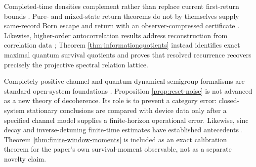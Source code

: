 Completed-time densities complement rather than replace current first-return
bounds \cite{KotowskiOszmaniec2026,GuptaShort2026}.  Pure- and mixed-state
return theorems do not by themselves supply same-record Born escape and
return with an observer-compressed certificate
\cite{GimenoSotoca2017,KotowskiOszmaniec2026}.  Likewise, higher-order
autocorrelation results address reconstruction from correlation data
\cite{YellottIverson1992,AgulnickBusickWarner2026}; Theorem
\ref{thm:informationquotients} instead identifies exact maximal quantum
survival quotients and proves that resolved recurrence recovers precisely the
projective spectral relation lattice.

Completely positive channel and quantum-dynamical-semigroup formalisms are
standard open-system foundations
\cite{GoriniKossakowskiSudarshan1976,Lindblad1976}.  Proposition
\ref{prop:reset-noise} is not advanced as a new theory of decoherence.  Its
role is to prevent a category error: closed-system stationary conclusions are
compared with device data only after a specified channel model supplies a
finite-horizon operational error.  Likewise, sinc decay and inverse-detuning
finite-time estimates have established antecedents
\cite{ShortFarrelly2012,MarkEtAl2024}.  Theorem
\ref{thm:finite-window-moments} is included as an exact calibration theorem
for the paper's own survival-moment observable, not as a separate novelty
claim.

